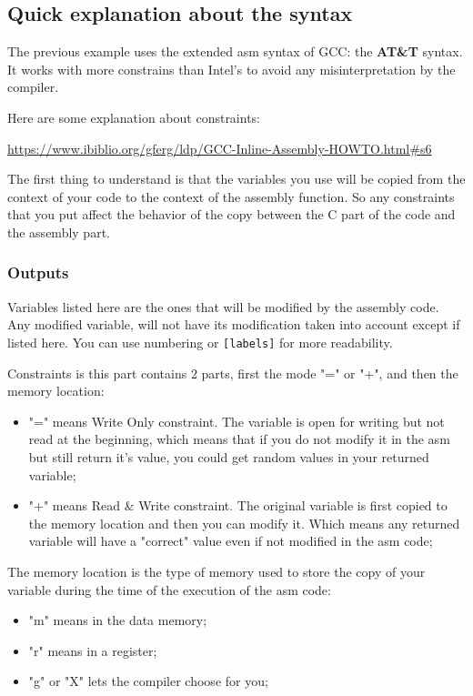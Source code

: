 \documentclass{article}
\begin{document}
\subsection{Quick explanation about the syntax}
The previous example uses the extended asm syntax of GCC: the \textbf{AT\&T} syntax.
It works with more constrains than Intel's to avoid any misinterpretation by the compiler.

Here are some explanation about constraints:

\url{https://www.ibiblio.org/gferg/ldp/GCC-Inline-Assembly-HOWTO.html#s6}

The first thing to understand is that the variables you use will be copied from the context of your code
to the context of the assembly function. So any constraints that you put affect the behavior of the copy
between the C part of the code and the assembly part.

\subsubsection{Outputs}
Variables listed here are the ones that will be modified by the assembly code. 
Any modified variable, will not have its modification taken into account except if listed here.
You can use numbering or \verb+[labels]+ for more readability.

Constraints is this part contains 2 parts, first the mode "=" or "+", and then the memory location:
\begin{itemize}
    \item "=" means Write Only constraint. The variable is open for writing but not read at the beginning,
                which means that if you do not modify it in the asm but still return it's value, you could get random
                values in your returned variable;
    \item "+" means Read \& Write constraint. The original variable is first copied to the memory location
                and then you can modify it. Which means any returned variable will have a "correct" value 
                even if not modified in the asm code;
\end{itemize}

The memory location is the type of memory used to store the copy of your variable during the time of the
execution of the asm code:
\begin{itemize}
    \item "m" means in the data memory;
    \item "r" means in a register;
    \item "g" or "X" lets the compiler choose for you;
\end{itemize}
\end{document}
